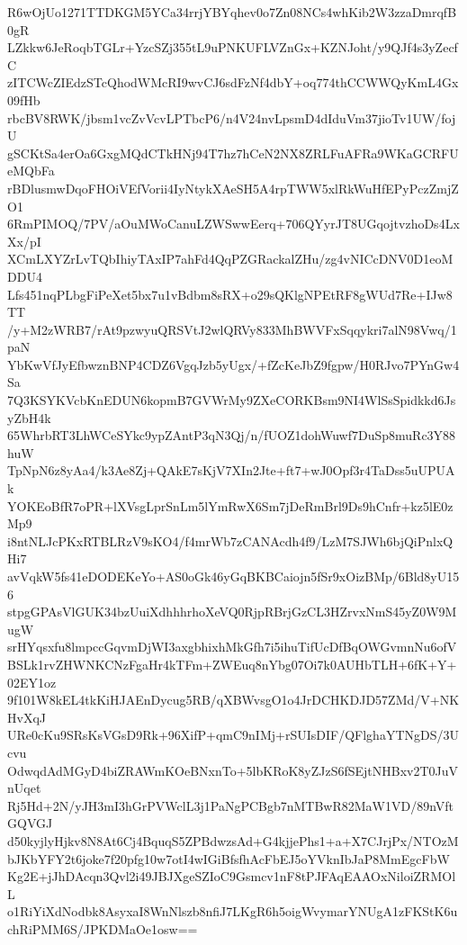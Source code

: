 R6wOjUo1271TTDKGM5YCa34rrjYBYqhev0o7Zn08NCs4whKib2W3zzaDmrqfB0gR
LZkkw6JeRoqbTGLr+YzcSZj355tL9uPNKUFLVZnGx+KZNJoht/y9QJf4s3yZecfC
zITCWcZIEdzSTcQhodWMcRI9wvCJ6sdFzNf4dbY+oq774thCCWWQyKmL4Gx09fHb
rbcBV8RWK/jbsm1vcZvVcvLPTbcP6/n4V24nvLpsmD4dIduVm37jioTv1UW/fojU
gSCKtSa4erOa6GxgMQdCTkHNj94T7hz7hCeN2NX8ZRLFuAFRa9WKaGCRFUeMQbFa
rBDlusmwDqoFHOiVEfVorii4IyNtykXAeSH5A4rpTWW5xlRkWuHfEPyPczZmjZO1
6RmPIMOQ/7PV/aOuMWoCanuLZWSwwEerq+706QYyrJT8UGqojtvzhoDs4LxXx/pI
XCmLXYZrLvTQbIhiyTAxIP7ahFd4QqPZGRackalZHu/zg4vNICcDNV0D1eoMDDU4
Lfs451nqPLbgFiPeXet5bx7u1vBdbm8sRX+o29sQKlgNPEtRF8gWUd7Re+IJw8TT
/y+M2zWRB7/rAt9pzwyuQRSVtJ2wlQRVy833MhBWVFxSqqykri7alN98Vwq/1paN
YbKwVfJyEfbwznBNP4CDZ6VgqJzb5yUgx/+fZcKeJbZ9fgpw/H0RJvo7PYnGw4Sa
7Q3KSYKVcbKnEDUN6kopmB7GVWrMy9ZXeCORKBsm9NI4WlSsSpidkkd6JsyZbH4k
65WhrbRT3LhWCeSYkc9ypZAntP3qN3Qj/n/fUOZ1dohWuwf7DuSp8muRc3Y88huW
TpNpN6z8yAa4/k3Ae8Zj+QAkE7sKjV7XIn2Jte+ft7+wJ0Opf3r4TaDss5uUPUAk
YOKEoBfR7oPR+lXVsgLprSnLm5lYmRwX6Sm7jDeRmBrl9Ds9hCnfr+kz5lE0zMp9
i8ntNLJcPKxRTBLRzV9sKO4/f4mrWb7zCANAcdh4f9/LzM7SJWh6bjQiPnlxQHi7
avVqkW5fs41eDODEKeYo+AS0oGk46yGqBKBCaiojn5fSr9xOizBMp/6Bld8yU156
stpgGPAsVlGUK34bzUuiXdhhhrhoXeVQ0RjpRBrjGzCL3HZrvxNmS45yZ0W9MugW
srHYqsxfu8lmpccGqvmDjWI3axgbhixhMkGfh7i5ihuTifUcDfBqOWGvmnNu6ofV
BSLk1rvZHWNKCNzFgaHr4kTFm+ZWEuq8nYbg07Oi7k0AUHbTLH+6fK+Y+02EY1oz
9f101W8kEL4tkKiHJAEnDycug5RB/qXBWvsgO1o4JrDCHKDJD57ZMd/V+NKHvXqJ
URe0cKu9SRsKsVGsD9Rk+96XifP+qmC9nIMj+rSUIsDIF/QFlghaYTNgDS/3Ucvu
OdwqdAdMGyD4biZRAWmKOeBNxnTo+5lbKRoK8yZJzS6fSEjtNHBxv2T0JuVnUqet
Rj5Hd+2N/yJH3mI3hGrPVWclL3j1PaNgPCBgb7nMTBwR82MaW1VD/89nVftGQVGJ
d50kyjlyHjkv8N8At6Cj4BquqS5ZPBdwzsAd+G4kjjePhs1+a+X7CJrjPx/NTOzM
bJKbYFY2t6joke7f20pfg10w7otI4wIGiBfsfhAcFbEJ5oYVknIbJaP8MmEgcFbW
Kg2E+jJhDAcqn3Qvl2i49JBJXgeSZIoC9Gsmcv1nF8tPJFAqEAAOxNiloiZRMOlL
o1RiYiXdNodbk8AsyxaI8WnNlszb8nfiJ7LKgR6h5oigWvymarYNUgA1zFKStK6u
chRiPMM6S/JPKDMaOe1osw==
